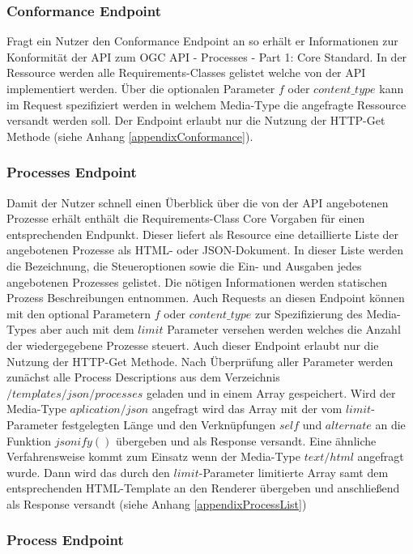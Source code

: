 \subsubsection{Conformance Endpoint}
Fragt ein Nutzer den Conformance Endpoint an so erhält er Informationen zur Konformität der API zum OGC API - Processes - Part 1: Core Standard. 
In der Ressource werden alle Requirements-Classes gelistet welche von der API implementiert werden. Über die optionalen Parameter $f$ oder $content\_type$ kann
im Request spezifiziert werden in welchem Media-Type die angefragte Ressource versandt werden soll. Der Endpoint erlaubt nur die Nutzung der HTTP-Get Methode
(siehe Anhang \ref{appendixConformance}). 

\subsubsection{Processes Endpoint}
Damit der Nutzer schnell einen Überblick über die von der API angebotenen Prozesse erhält enthält die Requirements-Class Core Vorgaben für einen entsprechenden Endpunkt.
Dieser liefert als Resource eine detaillierte Liste der angebotenen Prozesse als HTML- oder JSON-Dokument. In dieser Liste werden die Bezeichnung, die Steueroptionen sowie
die Ein- und Ausgaben jedes angebotenen Prozesses gelistet. Die nötigen Informationen werden statischen Prozess Beschreibungen entnommen.
Auch Requests an diesen Endpoint können mit den optional Parametern $f$ oder $content\_type$ zur Spezifizierung des Media-Types aber auch mit dem $limit$ Parameter versehen werden 
welches die Anzahl der wiedergegebene Prozesse steuert. Auch dieser Endpoint erlaubt nur die Nutzung der HTTP-Get Methode. 
Nach Überprüfung aller Parameter werden zunächst alle Process Descriptions aus dem Verzeichnis $/templates/json/processes$ geladen und in einem Array gespeichert.
Wird der Media-Type $aplication/json$ angefragt wird das Array mit der vom $limit$-Parameter festgelegten Länge und den Verknüpfungen $self$ und $alternate$ an die
Funktion $jsonify()$ übergeben und als Response versandt. Eine ähnliche Verfahrensweise kommt zum Einsatz wenn der Media-Type $text/html$ angefragt wurde. Dann wird das 
durch den $limit$-Parameter limitierte Array samt dem entsprechenden HTML-Template an den Renderer übergeben und anschließend als Response versandt (siehe Anhang \ref{appendixProcessList})

\subsubsection{Process Endpoint}
